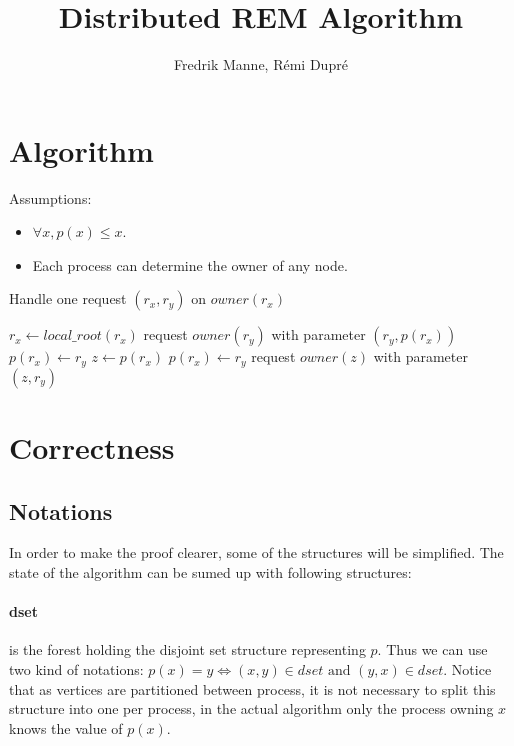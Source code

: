 \documentclass[12px]{article}
\title{Distributed REM Algorithm}
\author{Fredrik Manne, Rémi Dupré}
\begin{document}
  \maketitle

  \section{Algorithm}
  Assumptions:
  \begin{itemize}
    \item $\forall x, p(x) \leq x$.
    \item Each process can determine the owner of any node.
  \end{itemize}

  \begin{algorithm}
    \caption{Handle one request $(r_x, r_y)$ on $owner(r_x)$}
    \begin{algorithmic}[1]
      \State $r_x \gets local\_root(r_x)$
      \State
        \State request $owner(r_y)$ with parameter $(r_y, p(r_x))$
          \State $p(r_x) \gets r_y$
        \Else
          \State $z \gets p(r_x)$
          \State $p(r_x) \gets r_y$
          \State request $owner(z)$ with parameter $(z, r_y)$
        \EndIf
      \EndIf
    \end{algorithmic}
    \label{algo:handle_task}
  \end{algorithm}


  \section{Correctness}

  \subsection{Notations}
    In order to make the proof clearer, some of the structures will be simplified. The state of the algorithm can be sumed up with following structures:

    \paragraph{dset} is the forest holding the disjoint set structure representing $p$. Thus we can use two kind of notations: $p(x) = y \Leftrightarrow (x, y) \in dset \text{ and } (y, x) \in dset$. Notice that as vertices are partitioned between process, it is not necessary to split this structure into one per process, in the actual algorithm only the process owning $x$ knows the value of $p(x)$.
\end{document}
